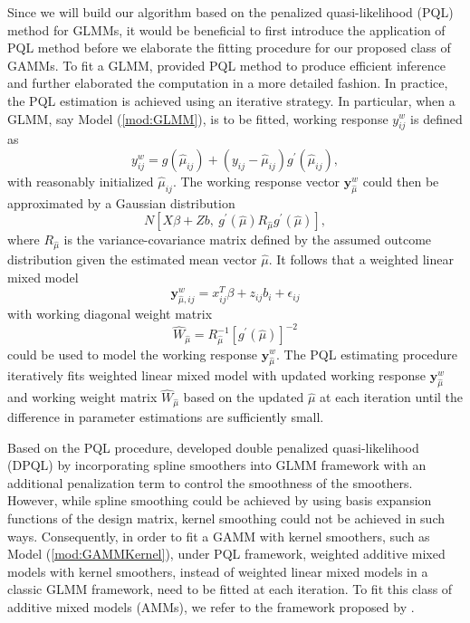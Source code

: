 	Since we will build our algorithm based on the penalized quasi-likelihood (PQL) method for GLMMs, it would be beneficial to first introduce the application of PQL method before we elaborate the fitting procedure for our proposed class of GAMMs. To fit a GLMM, \cite{breslow1993approximate} provided PQL method to produce efficient inference and \cite{wolfinger1993generalized} further elaborated the computation in a more detailed fashion. In practice, the PQL estimation is achieved using an iterative strategy. In particular, when a GLMM, say Model (\ref{mod:GLMM}), is to be fitted, working response $y_{ij}^w$ is defined as
	\begin{equation} \label{eq:workingresponse}
	y_{ij}^w=g(\hat{\mu}_{ij})+(y_{ij}-\hat{\mu}_{ij})g^\prime(\hat{\mu}_{ij}),
	\end{equation}
	with reasonably initialized $\hat{\mu}_{ij}$. The working response vector $\mathbf{y}_{\hat{\mu}}^w$ could then be approximated by a Gaussian distribution 
	\begin{equation} \label{eq:ApproxGauss}
	N[X\beta+Zb,\ g^\prime(\hat{\mu})R_{\hat{\mu}}  g^\prime(\hat{\mu})],
	\end{equation} 
	where $R_{\hat{\mu}}$ is the variance-covariance matrix defined by the assumed outcome distribution given the estimated mean vector $\hat{\mu}$. It follows that a weighted linear mixed model 
	\begin{equation} \label{mod:workingLME}
	\mathbf{y}_{\hat{\mu},ij}^w=x_{ij}^T\beta+z_{ij}b_i+\epsilon_{ij}
	\end{equation}
	with working diagonal weight matrix 
	\begin{equation} \label{eq:W}
	\hat{W}_{\hat{\mu}}=R_{\hat{\mu}}^{-1}[g^\prime(\hat{\mu})]^{-2}
	\end{equation} 
	could be used to model the working response $\mathbf{y}_{\hat{\mu}}^w$. The PQL estimating procedure iteratively fits weighted linear mixed model with updated working response $\mathbf{y}_{\hat{\mu}}^w$ and working weight matrix $\hat{W}_{\hat{\mu}}$ based on the updated $\hat{\mu}$ at each iteration until the difference in parameter estimations are sufficiently small. 
	
	Based on the PQL procedure, \cite{lin1999inference} developed double penalized quasi-likelihood (DPQL) by incorporating spline smoothers into GLMM framework with an additional penalization term to control the smoothness of the smoothers. However, while spline smoothing could be achieved by using basis expansion functions of the design matrix, kernel smoothing could not be achieved in such ways. Consequently, in order to fit a GAMM with kernel smoothers, such as Model (\ref{mod:GAMMKernel}), under PQL framework, weighted additive mixed models with kernel smoothers, instead of weighted linear mixed models in a classic GLMM framework, need to be fitted at each iteration. To fit this class of additive mixed models (AMMs), we refer to the framework proposed by \cite{Tang2020Additive}. 
	
